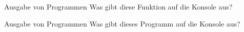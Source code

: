 \begin{task}{Ausgabe von Programmen}
    Was gibt diese Funktion auf die Konsole aus?

    \begin{solution}
    \end{solution}
\end{task}

\begin{task}{Ausgabe von Programmen}
    Was gibt dieses Programm auf die Konsole aus?

    \begin{solution}
    \end{solution}
\end{task}
